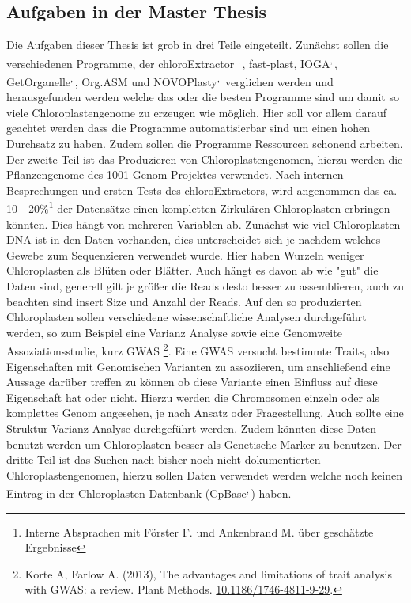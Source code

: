 \documentclass{scrartcl}
\begin{document}
\subsection{Aufgaben in der Master Thesis}
\label{sec-2-7}
Die Aufgaben dieser Thesis ist grob in drei Teile eingeteilt. Zunächst sollen die verschiedenen Programme, der chloroExtractor \footnotemark[16]{}\textsuperscript{,}\,\footnotemark[17]{}, fast-plast\footnotemark[23]{}, IOGA\footnotemark[32]{}\textsuperscript{,}\,\footnotemark[33]{}, GetOrganelle\footnotemark[29]{}\textsuperscript{,}\,\footnotemark[30]{},
Org.ASM\footnotemark[26]{} und NOVOPlasty\footnotemark[24]{}\textsuperscript{,}\,\footnotemark[25]{} verglichen werden und herausgefunden werden welche das oder die besten Programme sind um damit so viele Chloroplastengenome zu erzeugen wie 
möglich. Hier soll vor allem darauf geachtet werden dass die Programme automatisierbar sind um einen hohen Durchsatz zu haben. Zudem sollen die Programme Ressourcen schonend arbeiten. 
Der zweite Teil ist das Produzieren von Chloroplastengenomen, hierzu werden die Pflanzengenome des 1001 Genom Projektes verwendet. Nach internen Besprechungen und ersten Tests des chloroExtractors,
wird angenommen das ca. 10 - 20\%\footnote{Interne Absprachen mit Förster F. und Ankenbrand M. über geschätzte Ergebnisse} der Datensätze einen kompletten Zirkulären Chloroplasten erbringen könnten. Dies hängt von mehreren Variablen ab. Zunächst wie viel Chloroplasten DNA ist in den Daten vorhanden, dies
unterscheidet sich je nachdem welches Gewebe zum Sequenzieren verwendet wurde. Hier haben Wurzeln weniger Chloroplasten als Blüten oder Blätter. Auch hängt es davon ab wie "gut" die Daten sind, generell gilt je 
größer die Reads desto besser zu assemblieren, auch zu beachten sind insert Size und Anzahl der Reads.
Auf den so produzierten Chloroplasten sollen verschiedene wissenschaftliche Analysen durchgeführt werden, so zum Beispiel eine Varianz Analyse sowie eine Genomweite Assoziationsstudie, kurz GWAS \footnote{Korte A, Farlow A. (2013), The advantages and limitations of trait analysis with GWAS: a review. Plant Methods. \url{10.1186/1746-4811-9-29}.}.
Eine GWAS versucht bestimmte Traits, also Eigenschaften mit Genomischen Varianten zu assoziieren, um anschließend eine Aussage darüber treffen zu können ob diese Variante einen Einfluss auf diese 
Eigenschaft hat oder nicht. Hierzu werden die Chromosomen einzeln oder als komplettes Genom angesehen, je nach Ansatz oder Fragestellung.
Auch sollte eine Struktur Varianz Analyse durchgeführt werden. Zudem könnten diese Daten benutzt werden um Chloroplasten besser als Genetische Marker zu benutzen. 
Der dritte Teil ist das Suchen nach bisher noch nicht dokumentierten Chloroplastengenomen, hierzu sollen Daten verwendet werden welche noch keinen Eintrag in der Chloroplasten Datenbank (CpBase\footnotemark[37]{}\textsuperscript{,}\,\footnotemark[38]{}) haben.
\end{document}
